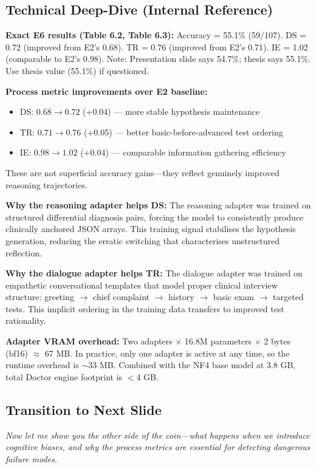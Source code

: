 \documentclass[12pt]{article}
\begin{document}
  \subsection*{Technical Deep-Dive (Internal Reference)}
  {\color{techgray}
  \textbf{Exact E6 results (Table 6.2, Table 6.3):} Accuracy = 55.1\% (59/107). DS = 0.72 (improved from E2's 0.68). TR = 0.76 (improved from E2's 0.71). IE = 1.02 (comparable to E2's 0.98). Note: Presentation slide says 54.7\%; thesis says 55.1\%. Use thesis value (55.1\%) if questioned.

  \textbf{Process metric improvements over E2 baseline:}
  \begin{itemize}
    \item DS: $0.68 \to 0.72$ (+0.04) --- more stable hypothesis maintenance
    \item TR: $0.71 \to 0.76$ (+0.05) --- better basic-before-advanced test ordering
    \item IE: $0.98 \to 1.02$ (+0.04) --- comparable information gathering efficiency
  \end{itemize}
  These are not superficial accuracy gains---they reflect genuinely improved reasoning trajectories.

  \textbf{Why the reasoning adapter helps DS:} The reasoning adapter was trained on structured differential diagnosis pairs, forcing the model to consistently produce clinically anchored JSON arrays. This training signal stabilises the hypothesis generation, reducing the erratic switching that characterises unstructured reflection.

  \textbf{Why the dialogue adapter helps TR:} The dialogue adapter was trained on empathetic conversational templates that model proper clinical interview structure: greeting $\to$ chief complaint $\to$ history $\to$ basic exam $\to$ targeted tests. This implicit ordering in the training data transfers to improved test rationality.

  \textbf{Adapter VRAM overhead:} Two adapters $\times$ 16.8M parameters $\times$ 2 bytes (bf16) $\approx$ 67 MB. In practice, only one adapter is active at any time, so the runtime overhead is $\sim$33 MB. Combined with the NF4 base model at 3.8 GB, total Doctor engine footprint is $<$4 GB.
  }

  \subsection*{Transition to Next Slide}
  {\color{transgreen}
  \textit{Now let me show you the other side of the coin---what happens when we introduce cognitive biases, and why the process metrics are essential for detecting dangerous failure modes.}
  }
\end{document}
